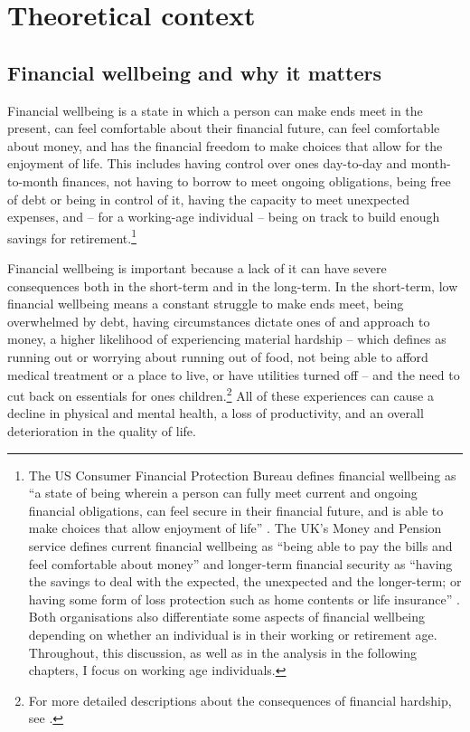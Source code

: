 
\section{Theoretical context}%
\label{sec:theoretical_context}


\subsection{Financial wellbeing and why it matters}%
\label{sub:financial_wellbeing_and_why_it_matters}

Financial wellbeing is a state in which a person can make ends meet in the
present, can feel comfortable about their financial future, can feel
comfortable about money, and has the financial freedom to make choices that
allow for the enjoyment of life. This includes having control over ones
day-to-day and month-to-month finances, not having to borrow to meet
ongoing obligations, being free of debt or being in control of it, having the
capacity to meet unexpected expenses, and -- for a working-age individual --
being on track to build enough savings for retirement.\footnote{The US Consumer
    Financial Protection Bureau defines financial wellbeing as ``a state of
    being wherein a person can fully meet current and ongoing financial
    obligations, can feel secure in their financial future, and is able to make
    choices that allow enjoyment of life'' \citep{cfpb2015financial}. The UK's
    Money and Pension service defines current financial wellbeing as ``being
    able to pay the bills and feel comfortable about money'' and longer-term
    financial security as ``having the savings to deal with the expected, the
    unexpected and the longer-term; or having some form of loss protection such
    as home contents or life insurance'' \citep{mps2018building}. Both
    organisations also differentiate some aspects of financial wellbeing
    depending on whether an individual is in their working or retirement age.
Throughout, this discussion, as well as in the analysis in the following
chapters, I focus on working age individuals.}

Financial wellbeing is important because a lack of it can have severe
consequences both in the short-term and in the long-term. In the short-term,
low financial wellbeing means a constant struggle to make ends meet, being
overwhelmed by debt, having circumstances dictate ones of and approach to
money, a higher likelihood of experiencing material hardship -- which
\citep{cfpb2017financial} defines as running out or worrying about running out
of food, not being able to afford medical treatment or a place to live, or have
utilities turned off -- and the need to cut back on essentials for ones
children.\footnote{For more detailed descriptions about the consequences of
    financial hardship, see \citet{cfpb2017financial, mps2018building,
stepchange2017strengthening}.} All of these experiences can cause a decline in
physical and mental health, a loss of productivity, and an overall
deterioration in the quality of life.


